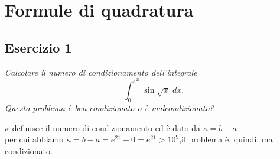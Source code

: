 \chapter{Formule di quadratura}
\label{chap:Cap5}

\section{Esercizio 1}
\label{sub:es1}
\emph{Calcolare il numero di condizionamento dell'integrale
$$\int_0^{e^{21}}\sin\sqrt{x}\;dx.$$
Questo problema è ben condizionato o è malcondizionato?}
\begin{sol}
	$\kappa$ definisce il numero di condizionamento ed è dato da $\kappa=b-a$\\
	per cui abbiamo $\kappa=b-a=e^{21}-0=e^{21}>10^{9}$,il	problema è, quindi, mal condizionato.
\end{sol}


